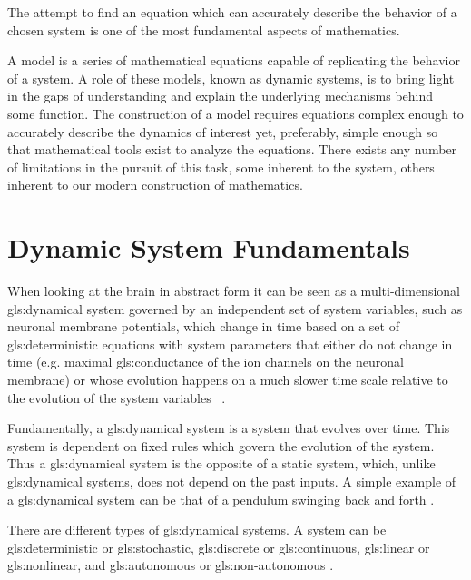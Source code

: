\documentclass[../../Orator.tex]{subfiles}
\begin{document}
The attempt to find an equation which can accurately describe the behavior of a chosen system is one of the most fundamental aspects of mathematics.

A model is a series of mathematical equations capable of replicating the behavior of a system. A role of these models, known as dynamic systems, is to bring light in the gaps of understanding and explain the underlying mechanisms behind some function. 
The construction of a model requires equations complex enough to accurately describe the dynamics of interest yet, preferably, simple enough so that mathematical tools exist to analyze the equations\footnotemark. 
There exists any number of limitations in the pursuit of this task, some inherent to the system, others inherent to our modern construction of mathematics.

\section{Dynamic System Fundamentals}
When looking at the brain in abstract form it can be seen as a multi-dimensional \gls{gls:dynamical system} governed by an independent set of system variables, such as neuronal membrane potentials, which change in time based on a set of \gls{gls:deterministic} equations with system parameters that either do not change in time (e.g. maximal \gls{gls:conductance} of the ion
channels on the neuronal membrane) or whose evolution happens on a much slower time scale relative to the evolution of the system variables ~\cite{STEFANESCU2012748}.


Fundamentally, a \gls{gls:dynamical system} is a system that evolves over time. This system is dependent on fixed rules which govern the evolution of the system. Thus a \gls{gls:dynamical system} is the opposite of a static system, which, unlike \gls{gls:dynamical system}s, does not depend on the past inputs. A simple example of a \gls{gls:dynamical system} can be that of a pendulum swinging back and forth \cite{}. 

There are different types of \gls{gls:dynamical system}s. A system can be \gls{gls:deterministic} or \gls{gls:stochastic}, \gls{gls:discrete} or \gls{gls:continuous}, \gls{gls:linear} or \gls{gls:nonlinear}, and \gls{gls:autonomous} or \gls{gls:non-autonomous} \cite{}. 
\end{document}
